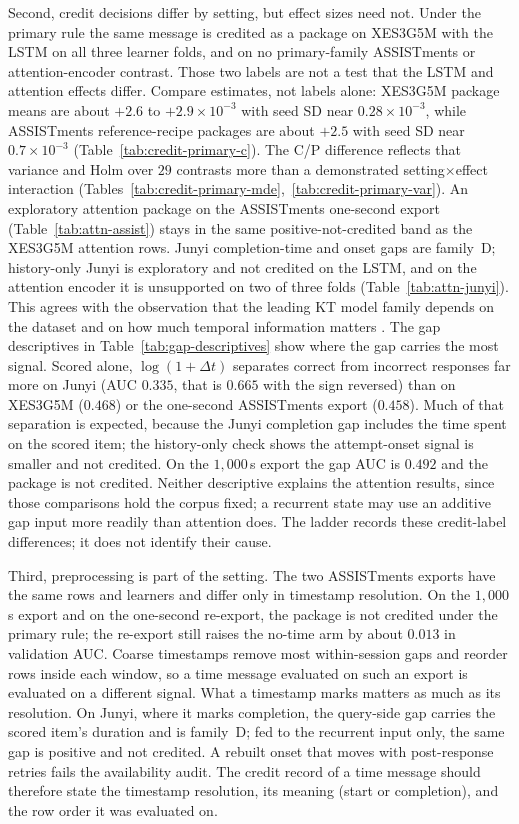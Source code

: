 \documentclass[review,12pt]{elsarticle}
\begin{document}
Second, credit decisions differ by setting, but effect sizes need not.
Under the primary rule the same message is credited as a package on
XES3G5M with the LSTM on all three learner folds, and on no
primary-family ASSISTments or attention-encoder contrast. Those two
labels are not a test that the LSTM and attention effects differ.
Compare estimates, not labels alone: XES3G5M package means are about
$+2.6$ to $+2.9\times 10^{-3}$ with seed SD near $0.28\times 10^{-3}$,
while ASSISTments reference-recipe packages are about $+2.5$ with seed
SD near $0.7\times 10^{-3}$ (Table~\ref{tab:credit-primary-c}). The C/P
difference reflects that variance and Holm over $29$ contrasts more than
a demonstrated setting$\times$effect interaction
(Tables~\ref{tab:credit-primary-mde},~\ref{tab:credit-primary-var}). An
exploratory attention package on the ASSISTments one-second export
(Table~\ref{tab:attn-assist}) stays in the same
positive-not-credited band as the XES3G5M attention rows.
Junyi completion-time and onset gaps are family~D; history-only Junyi
is exploratory and not credited on the LSTM, and on the attention
encoder it is unsupported on two of three folds
(Table~\ref{tab:attn-junyi}). This agrees with the observation that
the leading KT model family depends on the dataset and on how much
temporal information matters \cite{gervet2020deepkt}. The gap
descriptives in Table~\ref{tab:gap-descriptives} show where the gap
carries the most signal. Scored alone, $\log(1{+}\Delta t)$ separates
correct from incorrect responses far more on Junyi (AUC $0.335$, that
is $0.665$ with the sign reversed) than on XES3G5M ($0.468$) or the
one-second ASSISTments export ($0.458$). Much of that separation is
expected, because the Junyi completion gap includes the time spent on
the scored item; the history-only check shows the attempt-onset signal
is smaller and not credited. On the $1{,}000$\,s export the gap AUC is
$0.492$ and the package is not credited. Neither descriptive explains
the attention results, since those comparisons hold the corpus fixed; a
recurrent state may use an additive gap input more readily than
attention does. The ladder records these credit-label differences; it
does not identify their cause.

Third, preprocessing is part of the setting. The two ASSISTments
exports have the same rows and learners and differ only in timestamp
resolution. On the $1{,}000$\,s export and on the one-second re-export,
the package is not credited under the primary rule; the re-export
still raises the no-time arm by about $0.013$ in validation AUC. Coarse
timestamps remove most within-session gaps and reorder rows inside each
window, so a time message evaluated on such an export is evaluated on a
different signal. What a timestamp marks matters as much as its
resolution. On Junyi, where it marks completion, the query-side gap
carries the scored item's duration and is family~D; fed to the
recurrent input only, the same gap is positive and not credited. A
rebuilt onset that moves with post-response retries fails the
availability audit. The credit record of a time message should therefore
state the timestamp resolution, its meaning (start or completion), and
the row order it was evaluated on.
\end{document}
